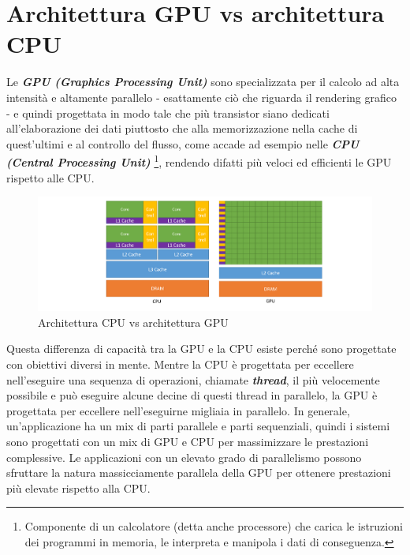 \section{Architettura GPU vs architettura CPU}
\noindent Le \textit{\textbf{GPU (Graphics Processing Unit)}} sono specializzata per il calcolo ad alta intensità e altamente parallelo - esattamente ciò che riguarda il rendering grafico - e quindi progettata in modo tale che più transistor siano dedicati all'elaborazione dei dati piuttosto che alla memorizzazione nella cache di quest'ultimi e al controllo del flusso, come accade ad esempio nelle \textit{\textbf{CPU (Central Processing Unit)}} \footnote{Componente di un calcolatore (detta anche processore) che carica le istruzioni dei programmi in memoria, le interpreta e manipola i dati di conseguenza.}, rendendo difatti più veloci ed efficienti le GPU rispetto alle CPU.
\begin{figure}[ht!]
    \centering
    \includegraphics[scale=0.6]{img/CPUvsGPU.png}
    \caption{Architettura CPU vs architettura GPU}
\end{figure}
\noindent Questa differenza di capacità tra la GPU e la CPU esiste perché sono progettate con obiettivi diversi in mente. Mentre la CPU è progettata per eccellere nell'eseguire una sequenza di operazioni, chiamate \textit{\textbf{thread}}, il più velocemente possibile e può eseguire alcune decine di questi thread in parallelo, la GPU è progettata per eccellere nell'eseguirne migliaia in parallelo.
\noindent In generale, un'applicazione ha un mix di parti parallele e parti sequenziali, quindi i sistemi sono progettati con un mix di GPU e CPU per massimizzare le prestazioni complessive. Le applicazioni con un elevato grado di parallelismo possono sfruttare la natura massicciamente parallela della GPU per ottenere prestazioni più elevate rispetto alla CPU\cite{Nvidia-architecture}.

